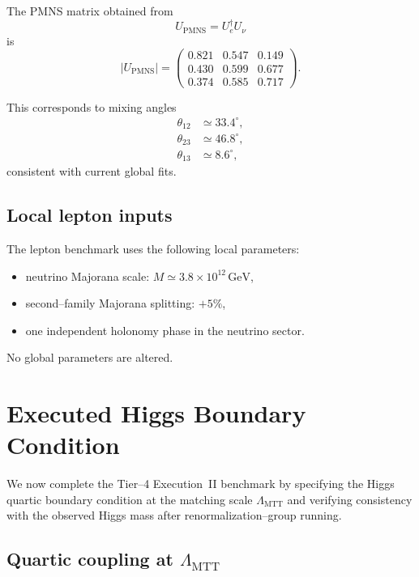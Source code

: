 \documentclass[11pt]{article}
\begin{document}
The PMNS matrix obtained from
\[
U_{\mathrm{PMNS}} = U_e^\dagger U_\nu
\]
is
\begin{equation}
|U_{\mathrm{PMNS}}| =
\begin{pmatrix}
0.821 & 0.547 & 0.149 \\
0.430 & 0.599 & 0.677 \\
0.374 & 0.585 & 0.717
\end{pmatrix}.
\label{eq:PMNS-exec}
\end{equation}

This corresponds to mixing angles
\begin{align}
\theta_{12} &\simeq 33.4^\circ, \\
\theta_{23} &\simeq 46.8^\circ, \\
\theta_{13} &\simeq 8.6^\circ,
\end{align}
consistent with current global fits.

\subsection{Local lepton inputs}

The lepton benchmark uses the following local parameters:
\begin{itemize}
  \item neutrino Majorana scale: $M \simeq 3.8\times10^{12}\,\mathrm{GeV}$,
  \item second--family Majorana splitting: $+5\%$,
  \item one independent holonomy phase in the neutrino sector.
\end{itemize}

No global parameters are altered.
\section{Executed Higgs Boundary Condition}
\label{sec:higgs-executed}

We now complete the Tier--4 Execution~II benchmark by specifying the
Higgs quartic boundary condition at the matching scale
$\Lambda_{\mathrm{MTT}}$ and verifying consistency with the observed
Higgs mass after renormalization--group running.

\subsection{Quartic coupling at $\Lambda_{\mathrm{MTT}}$}
\end{document}
